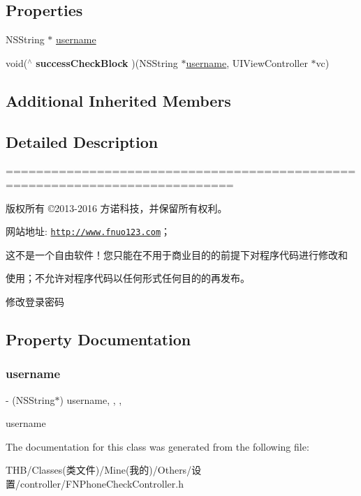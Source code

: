 \subsection*{Properties}
\begin{DoxyCompactItemize}
\item 
N\+S\+String $\ast$ \mbox{\hyperlink{interface_f_n_phone_check_controller_a3690b40fd43181bd986390712771fa61}{username}}
\item 
\mbox{\label{interface_f_n_phone_check_controller_a79c85431357bc15000e7adddee8956b5}} 
void($^\wedge$ {\bfseries success\+Check\+Block} )(N\+S\+String $\ast$\mbox{\hyperlink{interface_f_n_phone_check_controller_a3690b40fd43181bd986390712771fa61}{username}}, U\+I\+View\+Controller $\ast$vc)
\end{DoxyCompactItemize}
\subsection*{Additional Inherited Members}


\subsection{Detailed Description}
============================================================================

版权所有 ©2013-\/2016 方诺科技，并保留所有权利。

网站地址\+: \href{http://www.fnuo123.com}{\tt http\+://www.\+fnuo123.\+com}； 



这不是一个自由软件！您只能在不用于商业目的的前提下对程序代码进行修改和

使用；不允许对程序代码以任何形式任何目的的再发布。 



修改登录密码 

\subsection{Property Documentation}
\mbox{\label{interface_f_n_phone_check_controller_a3690b40fd43181bd986390712771fa61}} 
\subsubsection{\texorpdfstring{username}{username}}
{\footnotesize\ttfamily -\/ (N\+S\+String$\ast$) username\hspace{0.3cm}{\ttfamily [read]}, {\ttfamily [write]}, {\ttfamily [nonatomic]}, {\ttfamily [copy]}}

username 

The documentation for this class was generated from the following file\+:\begin{DoxyCompactItemize}
\item 
T\+H\+B/\+Classes(类文件)/\+Mine(我的)/\+Others/设置/controller/F\+N\+Phone\+Check\+Controller.\+h\end{DoxyCompactItemize}
